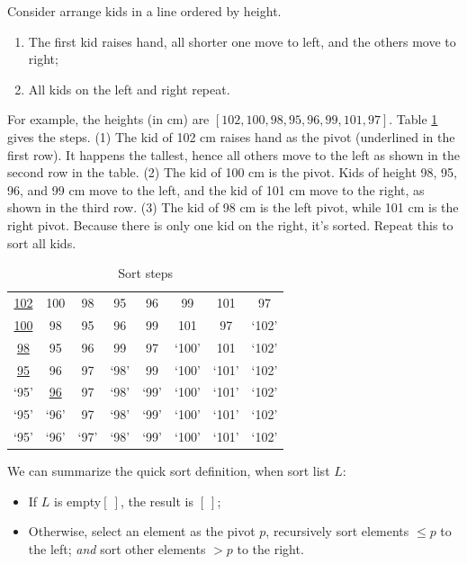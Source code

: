 \documentclass[b5paper]{article}
\begin{document}
Consider arrange kids in a line ordered by height.

\begin{enumerate}
\item The first kid raises hand, all shorter one move to left, and the others move to right;
\item All kids on the left and right repeat.
\end{enumerate}

For example, the heights (in cm) are $[102, 100, 98, 95, 96, 99, 101, 97]$. Table \cref{tab:kids-sort} gives the steps. (1) The kid of 102 cm raises hand as the pivot (underlined in the first row). It happens the tallest, hence all others move to the left as shown in the second row in the table. (2) The kid of 100 cm is the pivot. Kids of height 98, 95, 96, and 99 cm move to the left, and the kid of 101 cm move to the right, as shown in the third row. (3) The kid of 98 cm is the left pivot, while 101 cm is the right pivot. Because there is only one kid on the right, it's sorted. Repeat this to sort all kids.

\begin{table}[htbp]
\centering
\begin{tabular}{ | c c c c c c c c |}
\hline
\underline{102} & 100 & 98 & 95 & 96 & 99 & 101 & 97 \\
\underline{100} & 98 & 95 & 96 & 99 & 101 & 97 & `102' \\
\underline{98} & 95 & 96 & 99 & 97 & `100' & 101 & `102' \\
\underline{95} & 96 & 97 & `98' & 99 & `100' & `101' & `102' \\
`95' & \underline{96} & 97 & `98' & `99' & `100' & `101' & `102' \\
`95' & `96' & 97 & `98' & `99' & `100' & `101' & `102' \\
`95' & `96' & `97' & `98' & `99' & `100' & `101' & `102' \\
\hline
\end{tabular}
\caption{Sort steps}
\label{tab:kids-sort}
\end{table}

We can summarize the quick sort definition, when sort list $L$:

\begin{itemize}
\item If $L$ is empty$[\ ]$, the result is $[\ ]$;
\item Otherwise, select an element as the pivot $p$, recursively sort elements $\leq p$ to the left; {\em and} sort other elements $> p$ to the right.
\end{itemize}
\end{document}
